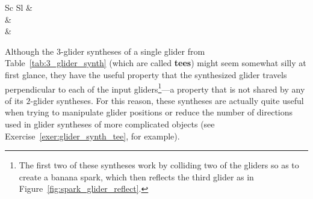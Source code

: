 \begin{table}[!htbp]
\begin{center}
\begin{tabular}{Sc Sl}
			  &  \\
			
			 &  \\
			
			  &  \\\bottomrule
		\end{tabular}
		\caption{A selection of useful $3$-glider syntheses. The $3$-glider collision that creates a glider-producing switch engine is not a true glider synthesis due to the fact that it also creates a wide assortment of other debris, but it is nonetheless noteworthy for being the only known way of generating infinite growth with just $3$ gliders.}\label{tab:3_glider_synth}
	\end{center}
\end{table}
\endgroup

Although the $3$-glider syntheses of a single glider from Table~\ref{tab:3_glider_synth} (which are called \textbf{tees}) might seem somewhat silly at first glance, they have the useful property that the synthesized glider travels perpendicular to each of the input gliders\footnote{The first two of these syntheses work by colliding two of the gliders so as to create a banana spark, which then reflects the third glider as in Figure~\ref{fig:spark_glider_reflect}.}---a property that is not shared by any of its $2$-glider syntheses. For this reason, these syntheses are actually quite useful when trying to manipulate glider positions or reduce the number of directions used in glider syntheses of more complicated objects (see Exercise~\ref{exer:glider_synth_tee}, for example).

